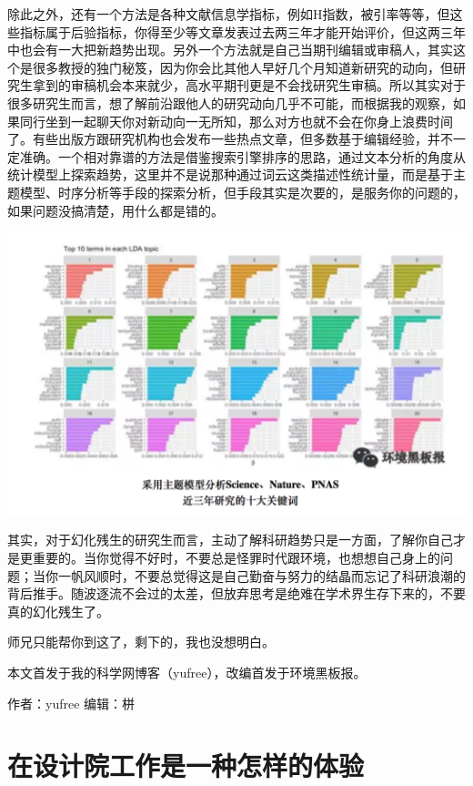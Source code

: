 \documentclass[
]{book}
\begin{document}
除此之外，还有一个方法是各种文献信息学指标，例如H指数，被引率等等，但这些指标属于后验指标，你得至少等文章发表过去两三年才能开始评价，但这两三年中也会有一大把新趋势出现。另外一个方法就是自己当期刊编辑或审稿人，其实这个是很多教授的独门秘笈，因为你会比其他人早好几个月知道新研究的动向，但研究生拿到的审稿机会本来就少，高水平期刊更是不会找研究生审稿。所以其实对于很多研究生而言，想了解前沿跟他人的研究动向几乎不可能，而根据我的观察，如果同行坐到一起聊天你对新动向一无所知，那么对方也就不会在你身上浪费时间了。有些出版方跟研究机构也会发布一些热点文章，但多数基于编辑经验，并不一定准确。一个相对靠谱的方法是借鉴搜索引擎排序的思路，通过文本分析的角度从统计模型上探索趋势，这里并不是说那种通过词云这类描述性统计量，而是基于主题模型、时序分析等手段的探索分析，但手段其实是次要的，是服务你的问题的，如果问题没搞清楚，用什么都是错的。

\includegraphics[width=6.67in]{images/hhcs6}

其实，对于幻化残生的研究生而言，主动了解科研趋势只是一方面，了解你自己才是更重要的。当你觉得不好时，不要总是怪罪时代跟环境，也想想自己身上的问题；当你一帆风顺时，不要总觉得这是自己勤奋与努力的结晶而忘记了科研浪潮的背后推手。随波逐流不会过的太差，但放弃思考是绝难在学术界生存下来的，不要真的幻化残生了。

师兄只能帮你到这了，剩下的，我也没想明白。

本文首发于我的科学网博客（yufree），改编首发于环境黑板报。

作者：yufree
编辑：栟

\hypertarget{ux5728ux8bbeux8ba1ux9662ux5de5ux4f5cux662fux4e00ux79cdux600eux6837ux7684ux4f53ux9a8c}{%
\section{在设计院工作是一种怎样的体验}\label{ux5728ux8bbeux8ba1ux9662ux5de5ux4f5cux662fux4e00ux79cdux600eux6837ux7684ux4f53ux9a8c}}
\end{document}

